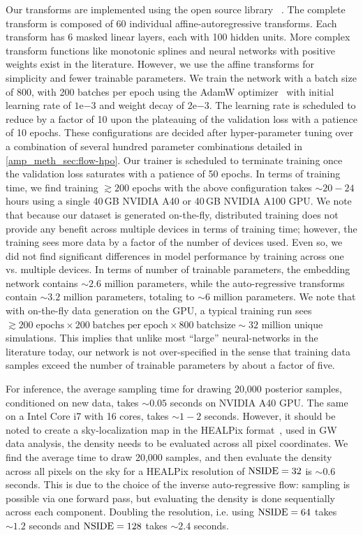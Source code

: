 \begin{refsection}
Our transforms are implemented using the open source library {\pyro}~\cite{JMLR:v20:18-403}. 
The complete transform is composed of 60 individual affine-autoregressive transforms. 
Each transform has 6 masked linear layers, each with 100 hidden units. 
More complex transform functions like monotonic splines and neural networks with positive weights exist in the literature. 
However, we use the affine transforms for simplicity and fewer trainable parameters. 
We train the network with a batch size of 800, with 200 batches per epoch using the AdamW optimizer~\cite{loshchilov2019decoupledweightdecayregularization} with initial learning rate of $1\mathrm{e}{-3}$ and weight decay of $2\mathrm{e}{-3}$. 
The learning rate is scheduled to reduce by a factor of 10 upon the plateauing of the validation loss with a patience of 10 epochs. 
These configurations are decided after hyper-parameter tuning over a combination of several hundred parameter combinations detailed in \ref{amp_meth_sec:flow-hpo}.
Our trainer is scheduled to terminate training once the validation loss saturates with a patience of 50 epochs. 
In terms of training time, we find training $\gtrsim 200$ epochs with the above configuration takes $\sim 20-24$ hours using a single 40\,GB NVIDIA A40 or 40\,GB NVIDIA A100
GPU.
We note that because our dataset is generated on-the-fly, distributed training does not provide any benefit across multiple devices in terms of training time; however, the training sees more data by a factor of the number of devices used. 
Even so, we did not find significant differences in model performance by training across one vs. multiple devices. 
In terms of number of trainable parameters, the embedding network contains $\sim 2.6$ million parameters, while the auto-regressive transforms contain $\sim 3.2$ million parameters, totaling to $\sim 6$ million parameters. 
We note that with on-the-fly data generation on the GPU, a typical training run sees $\gtrsim 200\;\mathrm{epochs} \times 200\;\mathrm{batches\;per\;epoch} \times 800\;\mathrm{batch size} \sim 32$ million unique simulations. 
This implies that unlike most ``large'' neural-networks in the literature today, our network is not over-specified in the sense that training data samples exceed the number of trainable parameters by about a factor of five.

For inference, the average sampling time for drawing 20,000 posterior samples, conditioned on new data, takes $\sim 0.05$ seconds on NVIDIA A40 GPU. 
The same on a Intel Core i7 with 16 cores, takes $\sim 1-2$ seconds. 
However, it should be noted to create a sky-localization map in the HEALPix format~\cite{GoHi2005}, used in GW data analysis, the density needs to be evaluated across all pixel coordinates. 
We find the average time to draw 20,000 samples, and then evaluate the density across all pixels on the sky for a HEALPix resolution of ${\mathrm{NSIDE}}=32$ is $\sim 0.6$ seconds. 
This is due to the choice of the inverse auto-regressive flow: sampling is possible via one forward pass, but evaluating the density is done sequentially across each component. 
Doubling the resolution, i.e. using ${\mathrm{NSIDE}} = 64$ takes $\sim 1.2$ seconds and ${\mathrm{NSIDE}} = 128$ takes $\sim 2.4$ seconds.


\end{refsection}
